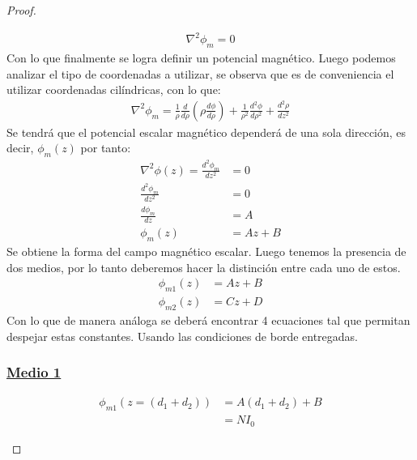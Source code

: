 \begin{proof}
\begin{enumerate}
\begin{align}
        \nabla^{2} \phi_{m}= 0 
    \end{align}
    Con lo que finalmente se logra definir un potencial magnético. Luego podemos analizar el tipo de coordenadas a utilizar, se observa que es de conveniencia el utilizar coordenadas cilíndricas, con lo que:
    \begin{align}
        \nabla^{2}\phi_{m} = \frac{1}{\rho} \frac{d}{d\rho}\left(\rho \frac{d\phi}{d\rho}\right) + \frac{1}{\rho^{2}}\frac{d^{2}\phi}{d\rho^{2}} + \frac{d^{2}\rho}{dz^{2}}
    \end{align}
    Se tendrá que el potencial escalar magnético dependerá de una sola dirección, es decir, $\phi_{m}(z)$ por tanto:
    \begin{align}
        \nabla^{2} \phi(z) = \frac{d^{2} \phi_{m}}{dz^{2}} &= 0\\
        \frac{d^{2} \phi_{m}}{dz^{2}} &= 0\\
        \frac{d\phi_{m}}{dz} &= A\\
        \phi_{m}(z) &= Az + B
    \end{align}
    Se obtiene la forma del campo magnético escalar. Luego tenemos la presencia de dos medios, por lo tanto deberemos hacer la distinción entre cada uno de estos.
    \begin{align}
        \phi_{m1}(z) &= Az + B \\
        \phi_{m2}(z) &= Cz + D 
    \end{align}
    Con lo que de manera análoga se deberá encontrar 4 ecuaciones tal que permitan despejar estas constantes. Usando las condiciones de borde entregadas.
    \subsubsection*{\underline{Medio 1}}
    \begin{align}
        \phi_{m1}(z=(d_{1} + d_{2}))  &= A(d_{1} + d_{2}) + B \\&= N I_{0} 
    \end{align}

\end{enumerate}
\end{proof}
